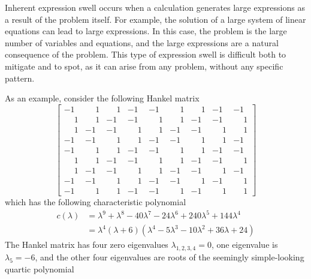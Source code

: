 Inherent expression swell occurs when a calculation generates large expressions as a result of the problem itself. For example, the solution of a large system of linear equations can lead to large expressions. In this case, the problem is the large number of variables and equations, and the large expressions are a natural consequence of the problem. This type of expression swell is difficult both to mitigate and to spot, as it can arise from any problem, without any specific pattern.
%
\begin{example}
  As an example, consider the following Hankel matrix
  \begin{equation*}
    \begin{bmatrix}
      -1 & \phantom{+}1 & \phantom{+}1 & -1 & -1 & \phantom{+}1 & \phantom{+}1 & -1 & -1 \\
      \phantom{+}1 & \phantom{+}1 & -1 & -1 & \phantom{+}1 & \phantom{+}1 & -1 & -1 & \phantom{+}1 \\
      \phantom{+}1 & -1 & -1 & \phantom{+}1 & \phantom{+}1 & -1 & -1 & \phantom{+}1 & \phantom{+}1 \\
      -1 & -1 & \phantom{+}1 & \phantom{+}1 & -1 & -1 & \phantom{+}1 & \phantom{+}1 & -1 \\
      -1 & \phantom{+}1 & \phantom{+}1 & -1 & -1 & \phantom{+}1 & \phantom{+}1 & -1 & -1 \\
      \phantom{+}1 & \phantom{+}1 & -1 & -1 & \phantom{+}1 & \phantom{+}1 & -1 & -1 & \phantom{+}1 \\
      \phantom{+}1 & -1 & -1 & \phantom{+}1 & \phantom{+}1 & -1 & -1 & \phantom{+}1 & -1 \\
      -1 & -1 & \phantom{+}1 & \phantom{+}1 & -1 & -1 & \phantom{+}1 & -1 & \phantom{+}1 \\
      -1 & \phantom{+}1 & \phantom{+}1 & -1 & -1 & \phantom{+}1 & -1 & \phantom{+}1 & \phantom{+}1
    \end{bmatrix}
  \end{equation*}
  which has the following characteristic polynomial
  \begin{equation*}
    \begin{aligned}
      c(\lambda) &= \lambda^9 + \lambda^8 - 40\lambda^7 - 24\lambda^6 + 240\lambda^5+ 144\lambda^4 \\
      &= \lambda^4 (\lambda + 6)(\lambda^4 - 5\lambda^3 - 10\lambda^2 + 36\lambda + 24)
    \end{aligned}
  \end{equation*}
  The Hankel matrix has four zero eigenvalues $\lambda_{1,2,3,4} = 0$, one eigenvalue is $\lambda_5 = -6$, and the other four eigenvalues are roots of the seemingly simple-looking quartic polynomial

\end{example}
